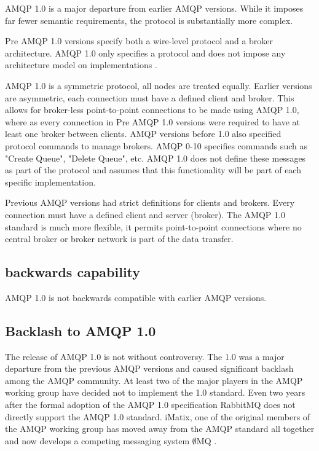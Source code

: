 \documentclass{thesis}
\begin{document}
AMQP 1.0 is a major departure from earlier AMQP versions.  While it imposes far fewer semantic requirements, the protocol is substantially more complex.   %

Pre AMQP 1.0 versions specify both a  wire-level protocol and a broker architecture.  AMQP 1.0 only specifies a protocol and does not impose any architecture model on implementations \cite{REDHAT1}.

AMQP 1.0 is a symmetric protocol, all nodes are treated equally.  Earlier versions are asymmetric, each connection must have a defined client and broker.  This allows for broker-less point-to-point connections to be made using AMQP 1.0, where as every connection in Pre AMQP 1.0 versions were required to have at least one broker between clients.  AMQP versions before 1.0 also specified protocol commands to manage brokers.  AMQP 0-10 specifies commands such as "Create Queue", "Delete Queue", etc.  AMQP 1.0 does not define these messages as part of the protocol and assumes that this functionality will be part of each specific implementation.  %

Previous AMQP versions had strict definitions for clients and brokers.  Every connection must have a defined client and server (broker).  The AMQP 1.0 standard is much more flexible, it permits point-to-point connections where no central broker or broker network is part of the data transfer.  

\subsection{backwards capability}

AMQP 1.0 is not backwards compatible with earlier AMQP versions.  

\subsection{Backlash to AMQP 1.0}

The release of AMQP 1.0 is not without controversy.  The 1.0 was a major departure from the previous AMQP versions and caused significant backlash among the AMQP community.  At least two of the major players in the AMQP working group have decided not to implement the 1.0 standard.  Even two years after the formal adoption of the AMQP 1.0 specification RabbitMQ does not directly support the AMQP 1.0 standard.  iMatix, one of the original members of the AMQP working group has moved away from the AMQP standard all together and now develops a competing messaging system $\emptyset$MQ \cite{ZERO_MQ}. 
\end{document}
